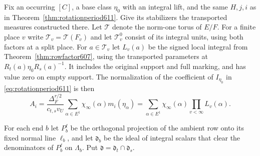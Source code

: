 \documentclass[a4paper,11pt]{article}
\theoremstyle{definition}
\theoremstyle{remark}
\numberwithin{equation}{section}
\begin{document}
Fix an occurring \([C]\), a base class \(\eta_0\) with an
integral lift, and the same \(H,j,i\) as in
Theorem~\ref{thm:rotationperiod611}. Give its stabilizers the
transported measures constructed there. Let \(\mathcal T\) denote
the norm-one torus of \(E/F\). For a finite place \(v\) write
\(\mathcal T_v=\mathcal T(F_v)\) and let \(\mathcal T_v^0\)
consist of its integral units, using both factors at a split place.
For \(a\in\mathcal T_v\) let \(L_v(a)\) be the signed local
integral from Theorem~\ref{thm:rowfactor607}, using the transported
parameters at \(R_t(a)\eta_0 R_s(a)^{-1}\). It includes the original
support and full marking, and has value zero on empty support.
The normalization of the coefficient of \(I_{\eta_0}\) in
\eqref{eq:rotationperiod611} is then
\begin{equation}
  A_i=\frac{\Delta_F^{r/2}}{c_{t,s}v_U}
             \sum_{\alpha\in E^1}\chi_\infty(\alpha)m_i(\eta_\alpha)
       =\sum_{\alpha\in E^1}\chi_\infty(\alpha)
                                      \prod_{v<\infty}L_v(\alpha).
  \label{eq:rotationnormalized612}
\end{equation}

For each end \(b\) let \(P_b^\ell\) be the orthogonal projection
of the ambient row onto its fixed normal line \(\ell_b\), and
let \(\mathfrak d_b\) be the ideal of integral scalars that clear
the denominators of \(P_b^\ell\) on \(\Lambda_b\). Put
\(\mathfrak d=\mathfrak d_t\cap\mathfrak d_s\).
\end{document}
